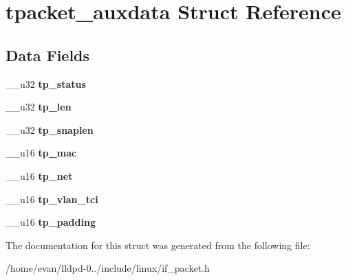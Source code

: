 \section{tpacket\-\_\-auxdata \-Struct \-Reference}
\label{structtpacket__auxdata}
\subsection*{\-Data \-Fields}
\begin{DoxyCompactItemize}
\item 
\-\_\-\-\_\-u32 {\bfseries tp\-\_\-status}\label{structtpacket__auxdata_af9d75e812fa4ac7875f4523632e504f7}

\item 
\-\_\-\-\_\-u32 {\bfseries tp\-\_\-len}\label{structtpacket__auxdata_abe67df7c04524b60f45a1ab757aec052}

\item 
\-\_\-\-\_\-u32 {\bfseries tp\-\_\-snaplen}\label{structtpacket__auxdata_a2a88b8ff6c0f5e97090acc008a23b9bf}

\item 
\-\_\-\-\_\-u16 {\bfseries tp\-\_\-mac}\label{structtpacket__auxdata_ae643e0917fc35773d760e2cd5a1bea22}

\item 
\-\_\-\-\_\-u16 {\bfseries tp\-\_\-net}\label{structtpacket__auxdata_a049ffb61207439057a2fcd60f11c47cb}

\item 
\-\_\-\-\_\-u16 {\bfseries tp\-\_\-vlan\-\_\-tci}\label{structtpacket__auxdata_a40eeea5c6e481f5faa918c77eabd4a52}

\item 
\-\_\-\-\_\-u16 {\bfseries tp\-\_\-padding}\label{structtpacket__auxdata_a2edcf6706f5651f8f3ab45f995081b11}

\end{DoxyCompactItemize}


\-The documentation for this struct was generated from the following file\-:\begin{DoxyCompactItemize}
\item 
/home/evan/lldpd-\/0../include/linux/if\-\_\-packet.\-h\end{DoxyCompactItemize}

